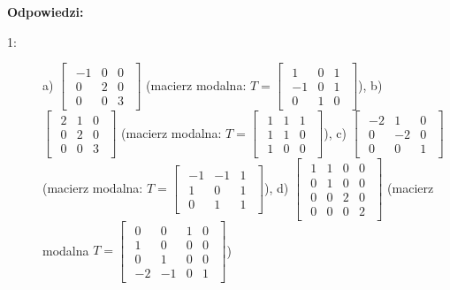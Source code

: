 \documentclass{article}
\begin{document}
\newpage
\textbf{Odpowiedzi:}
\begin{description}
    \item [1:] a) $\begin{bmatrix}\begin{array}{rrr} -1 & 0 & 0\\ 0 & 2 & 0\\ 0 & 0 & 3 \end{array}\end{bmatrix}$ (macierz modalna: $T = \begin{bmatrix}\begin{array}{rrr} 1 & 0 & 1\\ -1 & 0 & 1\\ 0 & 1 & 0 \end{array}\end{bmatrix}$), b) $\begin{bmatrix}\begin{array}{rrr} 2 & 1 & 0\\ 0 & 2 & 0\\ 0 & 0 & 3 \end{array}\end{bmatrix}$  (macierz modalna: $T = \begin{bmatrix}\begin{array}{rrr} 1 & 1 & 1\\ 1 & 1 & 0\\ 1 & 0 & 0 \end{array}\end{bmatrix}$), c) $\begin{bmatrix}\begin{array}{rrr} -2 & 1 & 0\\ 0 & -2 & 0\\ 0 & 0 & 1 \end{array}\end{bmatrix}$ (macierz modalna: $T = \begin{bmatrix}\begin{array}{rrr} -1 & -1 & 1\\ 1 & 0 & 1\\ 0 & 1 & 1 \end{array}\end{bmatrix}$), d) $\begin{bmatrix}\begin{array}{rrrr} 1 & 1 & 0 & 0\\ 0 & 1 & 0 & 0\\ 0 & 0 & 2 & 0\\ 0 & 0 & 0 & 2 \end{array}\end{bmatrix}$ (macierz modalna $T = \begin{bmatrix}\begin{array}{rrrr} 0 & 0 & 1 & 0\\ 1 & 0 & 0 & 0\\ 0 & 1 & 0 & 0\\ -2 & -1 & 0 & 1 \end{array}\end{bmatrix}$)


\end{description}
\end{document}
